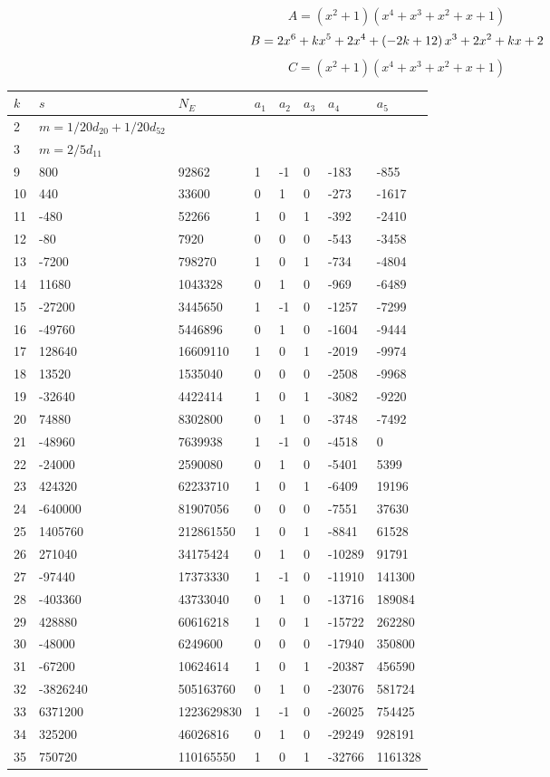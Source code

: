 \documentclass{amsart}
\begin{document}
$$A=(x^2
 + 1)(x^4
 + x^3
 + x^2
 + x
 + 1)$$
$$B=2\*x^6
 + k\*x^5
 + 2\*x^4
 + \left(-2\*k
 + 12\right) \*x^3
 + 2\*x^2
 + k\*x
 + 2$$
$$C=(x^2
 + 1)(x^4
 + x^3
 + x^2
 + x
 + 1)$$
\begin{longtable}{|l|l|l|lllll|}
\hline
$k$ & $s$ & $N_E$ & $a_1$ & $a_2$ & $a_3$ & $a_4$ & $a_5$\\
\hline
2&$m=1/20d_{20}+1/20d_{52}$&&\multicolumn{5}{c|}{}\\
3&$m=2/5d_{11}$&&\multicolumn{5}{c|}{}\\
9&800&92862&1&-1&0&-183&-855\\
10&440&33600&0&1&0&-273&-1617\\
11&-480&52266&1&0&1&-392&-2410\\
12&-80&7920&0&0&0&-543&-3458\\
13&-7200&798270&1&0&1&-734&-4804\\
14&11680&1043328&0&1&0&-969&-6489\\
15&-27200&3445650&1&-1&0&-1257&-7299\\
16&-49760&5446896&0&1&0&-1604&-9444\\
17&128640&16609110&1&0&1&-2019&-9974\\
18&13520&1535040&0&0&0&-2508&-9968\\
19&-32640&4422414&1&0&1&-3082&-9220\\
20&74880&8302800&0&1&0&-3748&-7492\\
21&-48960&7639938&1&-1&0&-4518&0\\
22&-24000&2590080&0&1&0&-5401&5399\\
23&424320&62233710&1&0&1&-6409&19196\\
24&-640000&81907056&0&0&0&-7551&37630\\
25&1405760&212861550&1&0&1&-8841&61528\\
26&271040&34175424&0&1&0&-10289&91791\\
27&-97440&17373330&1&-1&0&-11910&141300\\
28&-403360&43733040&0&1&0&-13716&189084\\
29&428880&60616218&1&0&1&-15722&262280\\
30&-48000&6249600&0&0&0&-17940&350800\\
31&-67200&10624614&1&0&1&-20387&456590\\
32&-3826240&505163760&0&1&0&-23076&581724\\
33&6371200&1223629830&1&-1&0&-26025&754425\\
34&325200&46026816&0&1&0&-29249&928191\\
35&750720&110165550&1&0&1&-32766&1161328\\

\end{longtable}
\end{document}
